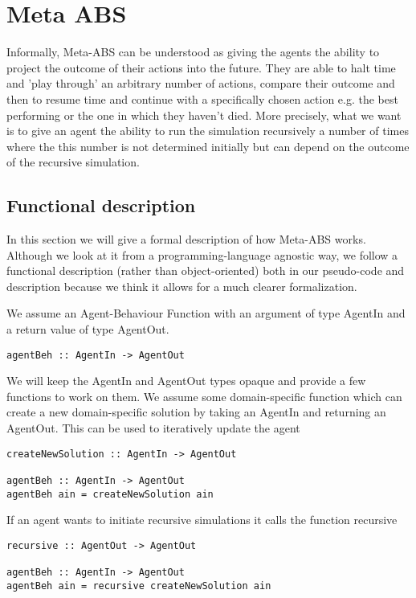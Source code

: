 \section{Meta ABS}
Informally, Meta-ABS can be understood as giving the agents the ability to project the outcome of their actions into the future. They are able to halt time and 'play through' an arbitrary number of actions, compare their outcome and then to resume time and continue with a specifically chosen action e.g. the best performing or the one in which they haven't died. 
More precisely, what we want is to give an agent the ability to run the simulation recursively a number of times where the this number is not determined initially but can depend on the outcome of the recursive simulation. 

\subsection{Functional description}
In this section we will give a formal description of how Meta-ABS works. Although we look at it from a programming-language agnostic way, we follow a functional description (rather than object-oriented) both in our pseudo-code and description because we think it allows for a much clearer formalization.

We assume an Agent-Behaviour Function with an argument of type AgentIn and a return value of type AgentOut.

\begin{lstlisting}[frame=single]
agentBeh :: AgentIn -> AgentOut
\end{lstlisting}

We will keep the AgentIn and AgentOut types opaque and provide a few functions to work on them. We assume some domain-specific function which can create a new domain-specific solution by taking an AgentIn and returning an AgentOut. This can be used to iteratively update the agent

\begin{lstlisting}[frame=single]
createNewSolution :: AgentIn -> AgentOut

agentBeh :: AgentIn -> AgentOut
agentBeh ain = createNewSolution ain
\end{lstlisting}

If an agent wants to initiate recursive simulations it calls the function recursive 

\begin{lstlisting}[frame=single]
recursive :: AgentOut -> AgentOut

agentBeh :: AgentIn -> AgentOut
agentBeh ain = recursive createNewSolution ain
\end{lstlisting}

